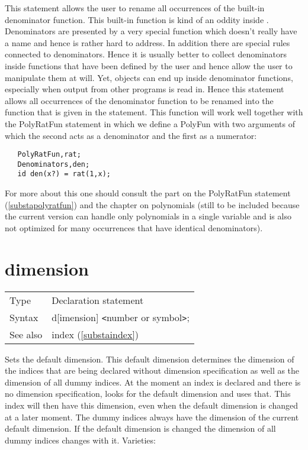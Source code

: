 \noindent This statement allows the user to rename all 
occurrences of the built-in denominator function. This built-in function is 
kind of an oddity inside \FORM. Denominators are presented by a very special 
function which doesn't really have a name and hence is rather hard to 
address. In addition there are special rules connected to denominators. 
Hence it is usually better to collect denominators inside functions that 
have been defined by the user and hence allow the user to manipulate them 
at will. Yet, objects can end up inside denominator functions, especially 
when output from other programs is read in. Hence this statement allows all 
occurrences of the denominator function to be renamed into the function 
that is given in the statement. This function will work well together with 
the PolyRatFun statement in which we define a PolyFun with two arguments of 
which the second acts as a denominator and the first as a numerator:
\begin{verbatim}
   PolyRatFun,rat;
   Denominators,den;
   id den(x?) = rat(1,x);
\end{verbatim}
For more about this one should consult the part on the 
PolyRatFun statement 
(\ref{substapolyratfun}) and the chapter on polynomials (still to be 
included because the current version can handle only polynomials in a 
single variable and is also not optimized for many occurrences that have 
identical denominators).
\vspace{10mm}

 
\section{dimension}
\label{substadimension}

\noindent \begin{tabular}{ll}
Type & Declaration statement\\
Syntax & d[imension] {\tt<}number or symbol{\tt>};
\\ See also & index (\ref{substaindex})
\end{tabular} \vspace{4mm}

\noindent Sets the default dimension. This default 
dimension determines the dimension of the indices that are 
being declared without dimension specification as well as the dimension of 
all dummy indices. At the moment an index is declared 
and there is no dimension specification, {\FORM} looks for the default 
dimension and uses that. This index will then have this dimension, even 
when the default dimension is changed at a later moment. The dummy indices 
always have the dimension of the current default dimension. If the default 
dimension is changed the dimension of all dummy indices changes with it. 
Varieties: \vspace{1mm}

